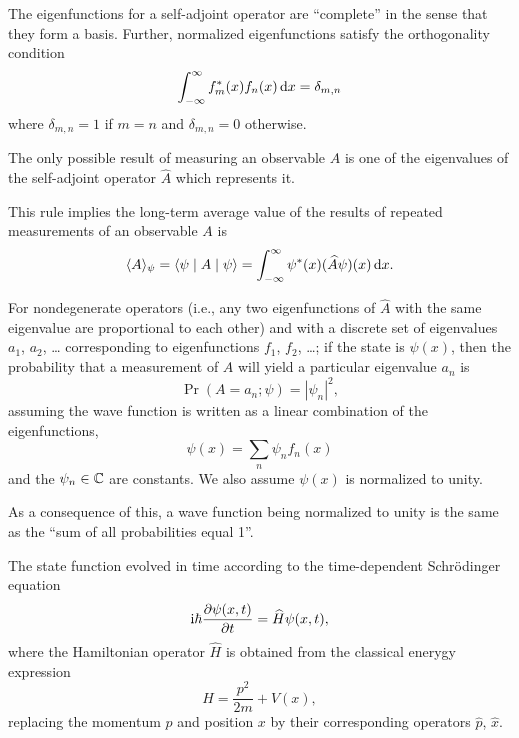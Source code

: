 \begin{remark}
The eigenfunctions for a self-adjoint operator are ``complete'' in the
sense that they form a basis. Further, normalized eigenfunctions satisfy
the orthogonality condition
\begin{equation}
\int^{\infty}_{-\infty}f_{m}^{*}(x)f_{n}(x)\,\mathrm{d} x = \delta_{m,n}
\end{equation}
where $\delta_{m,n}=1$ if $m=n$ and $\delta_{m,n}=0$ otherwise.
\end{remark}

The only possible result of measuring an observable $A$ is one of the
eigenvalues of the self-adjoint operator $\widehat{A}$ which represents
it.

\begin{remark}
This rule implies the long-term average value of the results of repeated
measurements of an observable $A$ is
\begin{equation}
\langle A\rangle_{\psi} = \langle\psi\mid A\mid\psi\rangle = \int^{\infty}_{-\infty}\psi^{*}(x)(\widehat{A}\psi)(x)\,\mathrm{d} x.
\end{equation}
\end{remark}

\M
For nondegenerate operators (i.e., any two eigenfunctions of
$\widehat{A}$ with the same eigenvalue are proportional to each other)
and with a discrete set of eigenvalues $a_{1}$, $a_{2}$, \dots
corresponding to eigenfunctions $f_{1}$, $f_{2}$, \dots; if the state is
$\psi(x)$, then the probability that a measurement of $A$ will yield a
particular eigenvalue $a_{n}$ is
\begin{equation}
\Pr(A = a_{n}; \psi) = |\psi_{n}|^{2},
\end{equation}
assuming the wave function is written as a linear combination of the
eigenfunctions,
\begin{equation}
\psi(x) = \sum_{n}\psi_{n}f_{n}(x)
\end{equation}
and the $\psi_{n}\in\mathbb{C}$ are constants. We also assume $\psi(x)$ is
normalized to unity.

\begin{remark}
As a consequence of this, a wave function being normalized to unity is
the same as the ``sum of all probabilities equal 1''.
\end{remark}

The state function evolved in time according to the time-dependent
Schr\"{o}dinger equation
\begin{equation}
\mathrm{i}\hbar\frac{\partial\psi(x,t)}{\partial t} = \widehat{H}\psi(x,t),
\end{equation}
where the Hamiltonian operator $\widehat{H}$ is obtained from the
classical enerygy expression
\begin{equation}
H = \frac{p^{2}}{2m} + V(x),
\end{equation}
replacing the momentum $p$ and position $x$ by their corresponding
operators $\widehat{p}$, $\widehat{x}$.

